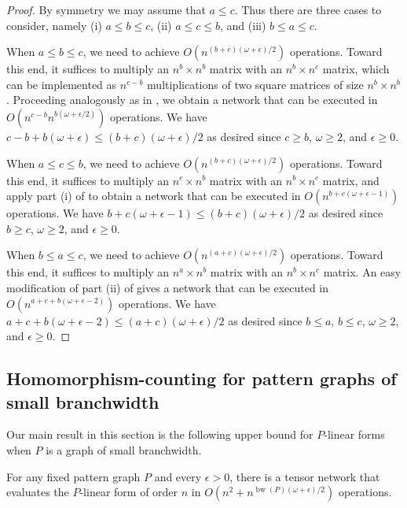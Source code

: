 \documentclass{toc}
\DeclareMathOperator{\bw}{bw}
\begin{document}
\begin{proof}
By symmetry we may assume that $a\leq c$. Thus there are three cases
to consider, namely (i) $a\leq b\leq c$, (ii) $a\leq c\leq b$, and
(iii) $b\leq a\leq c$.

When $a\leq b\leq c$, we need to achieve $O(n^{(b+c)(\omega+\epsilon)/2})$
operations. Toward this end, it suffices to multiply an $n^b\times n^b$ matrix
with an $n^b\times n^c$ matrix, which can be implemented as $n^{c-b}$
multiplications of two square matrices of size $n^b\times n^b$.
Proceeding analogously as in , we obtain a network that
can be executed in $O(n^{c-b}n^{b(\omega+\epsilon/2)})$ operations.
We have $c-b+b(\omega+\epsilon)\leq (b+c)(\omega+\epsilon)/2$ as desired
since $c\geq b$, $\omega\geq 2$, and $\epsilon\geq 0$.

When $a\leq c\leq b$, we need to achieve $O(n^{(b+c)(\omega+\epsilon)/2})$
operations. Toward this end, it suffices to multiply an $n^c\times n^b$ matrix
with an $n^b\times n^c$ matrix, and apply part (i) of  to obtain
a network that can be executed in $O(n^{b+c(\omega+\epsilon-1)})$ operations.
We have $b+c(\omega+\epsilon-1)\leq (b+c)(\omega+\epsilon)/2$ as desired
since $b\geq c$, $\omega\geq 2$, and $\epsilon\geq 0$.

When $b\leq a\leq c$, we need to achieve $O(n^{(a+c)(\omega+\epsilon)/2})$
operations. Toward this end, it suffices to multiply an $n^a\times n^b$ matrix
with an $n^b\times n^c$ matrix. An easy modification of part (ii) of
 gives a network that can be executed in
$O(n^{a+c+b(\omega+\epsilon-2)})$ operations.
We have $a+c+b(\omega+\epsilon-2)\leq (a+c)(\omega+\epsilon)/2$ as desired
since $b\leq a$, $b\leq c$, $\omega\geq 2$, and $\epsilon\geq 0$.
\end{proof}


\subsection{Homomorphism-counting for pattern graphs of small branchwidth}

Our main result in this section is the following upper bound for $P$-linear forms when $P$ is a graph
of small branchwidth.

\begin{lemma}
  \label{lem:branchwidth ub}
  For any fixed pattern graph $P$ and every $\epsilon > 0$, there is a tensor network that evaluates the $P$-linear form of order $n$
  in $O(n^2 + n^{\bw(P) (\omega + \epsilon) / 2})$ operations.
\end{lemma}
\end{document}
